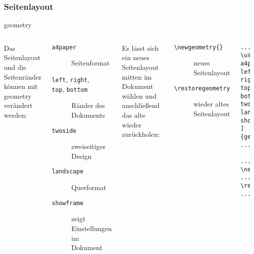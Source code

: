 \subsubsection{Seitenlayout}
\begin{frame}[fragile]{geometry}

\begin{columns}[c]

    Das Seitenlayout und die Seitenränder können mit geometry verändert werden:
    \begin{description}  
 \item[\texttt{a4paper}] Seitenformat 
 \item[\texttt{left}, \texttt{right},]
 \item[\texttt{top}, \texttt{bottom}] Ränder des 
 Dokuments
 \item[\texttt{twoside}] zweiseitiges Design
  \item[\texttt{landscape}] Querformat
      \item[\texttt{showframe}] zeigt Einstellungen im Dokument 
    \end{description}
Es lässt sich ein neues Seitenlayout mitten im Dokument wählen und anschließend das alte wieder zurückholen:
\begin{description}
       \item[\texttt{\textbackslash newgeometry\{\}}]  neues Seitenlayout
        \item[\texttt{\textbackslash restoregeometry}]  wieder altes Seitenlayout
\end{description}


\begin{lstlisting}[]
...
\usepackage[ 
a4paper, 
left=2cm, 
right=0.5\textwidth, 
top=5cm, 
bottom=0.5\textheight,
twoside, 
landscape, 
showframe
]{geometry}
...

...
\newgeometry{left=5cm}
...
\restoregeometry 
...

\end{lstlisting}

    
  \end{columns}


\end{frame}

